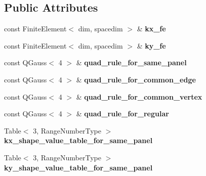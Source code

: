 \subsection*{Public Attributes}
\begin{DoxyCompactItemize}
\item 
\mbox{\label{classLaplaceBEM_1_1BEMValues_aac76dabf40c054fb5a2608cf1a70d0df}} 
const Finite\+Element$<$ dim, spacedim $>$ \& {\bfseries kx\+\_\+fe}
\item 
\mbox{\label{classLaplaceBEM_1_1BEMValues_a3b43f60bbc1d59238f201fa0e43325b4}} 
const Finite\+Element$<$ dim, spacedim $>$ \& {\bfseries ky\+\_\+fe}
\item 
\mbox{\label{classLaplaceBEM_1_1BEMValues_aa6335f94192596e5512eee34aec37425}} 
const Q\+Gauss$<$ 4 $>$ \& {\bfseries quad\+\_\+rule\+\_\+for\+\_\+same\+\_\+panel}
\item 
\mbox{\label{classLaplaceBEM_1_1BEMValues_ab60f71cb70c2e1f437026e705ba81c45}} 
const Q\+Gauss$<$ 4 $>$ \& {\bfseries quad\+\_\+rule\+\_\+for\+\_\+common\+\_\+edge}
\item 
\mbox{\label{classLaplaceBEM_1_1BEMValues_afa138022ebdf7eac374f4f3da75d667b}} 
const Q\+Gauss$<$ 4 $>$ \& {\bfseries quad\+\_\+rule\+\_\+for\+\_\+common\+\_\+vertex}
\item 
\mbox{\label{classLaplaceBEM_1_1BEMValues_a9639fb8cd2877d40d3142b4e43de00ce}} 
const Q\+Gauss$<$ 4 $>$ \& {\bfseries quad\+\_\+rule\+\_\+for\+\_\+regular}
\item 
\mbox{\label{classLaplaceBEM_1_1BEMValues_a8e9a1d06a301dd95d70860159ecd990f}} 
Table$<$ 3, Range\+Number\+Type $>$ {\bfseries kx\+\_\+shape\+\_\+value\+\_\+table\+\_\+for\+\_\+same\+\_\+panel}
\item 
\mbox{\label{classLaplaceBEM_1_1BEMValues_a87347e8cacd41bf1ef0d83a2cf921889}} 
Table$<$ 3, Range\+Number\+Type $>$ {\bfseries ky\+\_\+shape\+\_\+value\+\_\+table\+\_\+for\+\_\+same\+\_\+panel}
\item 

\end{DoxyCompactItemize}
